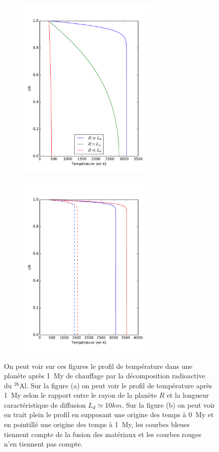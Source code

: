 \documentclass[10pt,a4paper]{article}
\numberwithin{equation}{section}
\begin{document}
\begin{figure}
\centering
\begin{subfigure}{.49\textwidth}
  \centering
  \includegraphics[height=9cm]{./figures/graph_sim1_fig2.pdf}
  \caption{}
  \label{fig1:sub1}
\end{subfigure}
\begin{subfigure}{.5\textwidth}
  \centering
  
  \includegraphics[height=9cm]{./figures/graph_sim1_fig1.pdf}
  \caption{}
  \label{fig1:sub2}
\end{subfigure}%

\caption{On peut voir sur ces figures le profil de température dans une planète après \SI{1}{My} de chauffage par la décomposition radioactive du $^{26}$Al. Sur la figure (a) on peut voir le profil de température après \SI{1}{My} selon le rapport entre le rayon de la planète $R$ et la longueur caractéristique de diffusion $L_d \simeq 10 km $.  Sur la figure (b) on peut voir en trait plein le profil en supposant une origine des temps à \SI{0}{My} et en pointillé une origine des temps à \SI{1}{My}, les courbes bleues tiennent compte de la fusion des matériaux et les courbes rouges n'en tiennent pas compte.}
\label{fig1}
\end{figure}
\end{document}
